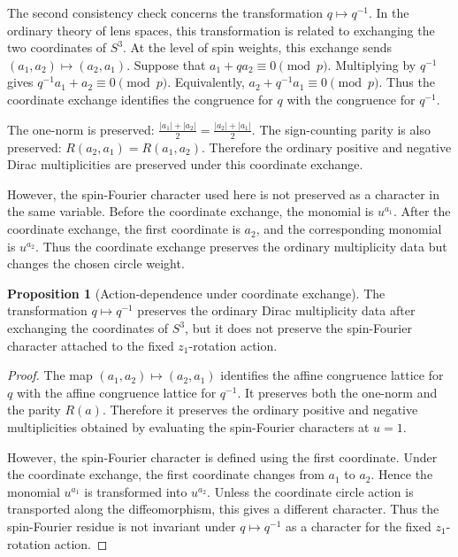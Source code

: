 \documentclass{article}
\theoremstyle{definition}
\newtheorem{proposition}[theorem]{Proposition}
\numberwithin{equation}{section}
\begin{document}
The second consistency check concerns the transformation $q\mapsto q^{-1}$.  In the ordinary theory of lens spaces, this transformation is related to exchanging the two coordinates of $S^3$.  At the level of spin weights, this exchange sends $(a_1,a_2)\longmapsto(a_2,a_1).$ Suppose that $a_1+q a_2\equiv0\pmod p.$ Multiplying by $q^{-1}$ gives $q^{-1}a_1+a_2\equiv0\pmod p.$ Equivalently, $a_2+q^{-1}a_1\equiv0\pmod p.$ Thus the coordinate exchange identifies the congruence for $q$ with the congruence for $q^{-1}$.

The one-norm is preserved: $\frac{|a_1|+|a_2|}{2}=\frac{|a_2|+|a_1|}{2}.$ The sign-counting parity is also preserved: $R(a_2,a_1)=R(a_1,a_2).$ Therefore the ordinary positive and negative Dirac multiplicities are preserved under this coordinate exchange.

However, the spin-Fourier character used here is not preserved as a character in the same variable.  Before the coordinate exchange, the monomial is $u^{a_1}.$ After the coordinate exchange, the first coordinate is $a_2$, and the corresponding monomial is $u^{a_2}.$ Thus the coordinate exchange preserves the ordinary multiplicity data but changes the chosen circle weight.

\begin{proposition}[Action-dependence under coordinate exchange]
The transformation $q\mapsto q^{-1}$ preserves the ordinary Dirac multiplicity data after exchanging the coordinates of $S^3$, but it does not preserve the spin-Fourier character attached to the fixed $z_1$-rotation action.
\end{proposition}

\begin{proof}
The map $(a_1,a_2)\longmapsto(a_2,a_1)$ identifies the affine congruence lattice for $q$ with the affine congruence lattice for $q^{-1}$.  It preserves both the one-norm and the parity $R(a)$.  Therefore it preserves the ordinary positive and negative multiplicities obtained by evaluating the spin-Fourier characters at $u=1$.

However, the spin-Fourier character is defined using the first coordinate.  Under the coordinate exchange, the first coordinate changes from $a_1$ to $a_2$.  Hence the monomial $u^{a_1}$ is transformed into $u^{a_2}$.  Unless the coordinate circle action is transported along the diffeomorphism, this gives a different character.  Thus the spin-Fourier residue is not invariant under $q\mapsto q^{-1}$ as a character for the fixed $z_1$-rotation action.
\end{proof}
\end{document}
